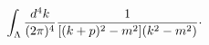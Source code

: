 \begin{equation}
\int_{\Lambda }\frac{d^{4}k}{(2\pi )^{4}}\frac{1}{%
[(k+p)^{2}-m^{2}](k^{2}-m^{2})}\cdot   \label{1}
\end{equation}

